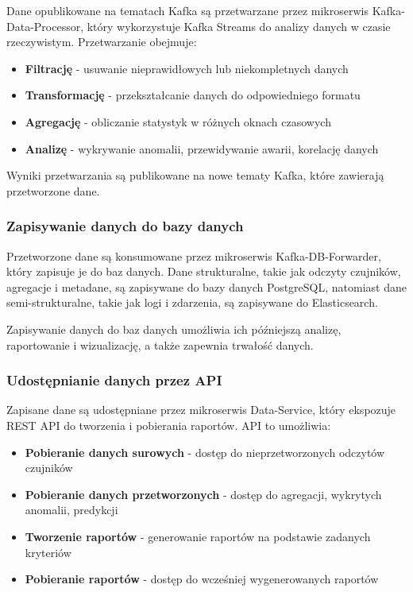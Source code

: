 Dane opublikowane na tematach Kafka są przetwarzane przez mikroserwis Kafka-Data-Processor, który wykorzystuje Kafka Streams do analizy danych w czasie rzeczywistym. Przetwarzanie obejmuje:

\begin{itemize}
    \item \textbf{Filtrację} - usuwanie nieprawidłowych lub niekompletnych danych
    \item \textbf{Transformację} - przekształcanie danych do odpowiedniego formatu
    \item \textbf{Agregację} - obliczanie statystyk w różnych oknach czasowych
    \item \textbf{Analizę} - wykrywanie anomalii, przewidywanie awarii, korelację danych
\end{itemize}

Wyniki przetwarzania są publikowane na nowe tematy Kafka, które zawierają przetworzone dane.

\subsubsection{Zapisywanie danych do bazy danych}
\label{subsubsec:zapisywanie_danych}

Przetworzone dane są konsumowane przez mikroserwis Kafka-DB-Forwarder, który zapisuje je do baz danych. Dane strukturalne, takie jak odczyty czujników,
agregacje i metadane, są zapisywane do bazy danych PostgreSQL, natomiast dane semi-strukturalne, takie jak logi i zdarzenia, są zapisywane do Elasticsearch.

Zapisywanie danych do baz danych umożliwia ich późniejszą analizę, raportowanie i wizualizację, a także zapewnia trwałość danych.

\subsubsection{Udostępnianie danych przez API}
\label{subsubsec:udostepnianie_danych}

Zapisane dane są udostępniane przez mikroserwis Data-Service, który ekspozuje REST API do tworzenia i pobierania raportów. API to umożliwia:

\begin{itemize}
    \item \textbf{Pobieranie danych surowych} - dostęp do nieprzetworzonych odczytów czujników
    \item \textbf{Pobieranie danych przetworzonych} - dostęp do agregacji, wykrytych anomalii, predykcji
    \item \textbf{Tworzenie raportów} - generowanie raportów na podstawie zadanych kryteriów
    \item \textbf{Pobieranie raportów} - dostęp do wcześniej wygenerowanych raportów
\end{itemize}

